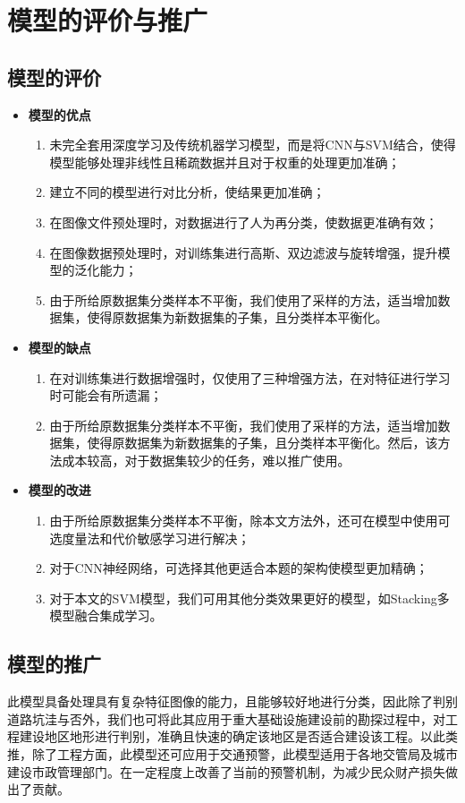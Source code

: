 \documentclass{MathorCupmodeling}
\begin{document}
	\section{模型的评价与推广}
	\subsection{模型的评价}
	\begin{itemize}
		\item \textbf{模型的优点}
		\begin{enumerate}
			\item 未完全套用深度学习及传统机器学习模型，而是将CNN与SVM结合，使得模型能够处理非线性且稀疏数据并且对于权重的处理更加准确；
			\item 建立不同的模型进行对比分析，使结果更加准确；
			\item 在图像文件预处理时，对数据进行了人为再分类，使数据更准确有效；
			\item 在图像数据预处理时，对训练集进行高斯、双边滤波与旋转增强，提升模型的泛化能力；
			\item 由于所给原数据集分类样本不平衡，我们使用了采样的方法，适当增加数据集，使得原数据集为新数据集的子集，且分类样本平衡化。
		\end{enumerate}
		\item \textbf{模型的缺点}
		\begin{enumerate}
			\item 在对训练集进行数据增强时，仅使用了三种增强方法，在对特征进行学习时可能会有所遗漏；
			\item 由于所给原数据集分类样本不平衡，我们使用了采样的方法，适当增加数据集，使得原数据集为新数据集的子集，且分类样本平衡化。然后，该方法成本较高，对于数据集较少的任务，难以推广使用。
		\end{enumerate}
		\item \textbf{模型的改进}
		\begin{enumerate}
			\item 由于所给原数据集分类样本不平衡，除本文方法外，还可在模型中使用可选度量法和代价敏感学习进行解决\textcolor{blue}{\cite{数据挖掘导论}}；
			\item 对于CNN神经网络，可选择其他更适合本题的架构使模型更加精确；
			\item 对于本文的SVM模型，我们可用其他分类效果更好的模型，如Stacking多模型融合集成学习。
		\end{enumerate}
	\end{itemize}
	\subsection{模型的推广}
	此模型具备处理具有复杂特征图像的能力，且能够较好地进行分类，因此除了判别道路坑洼与否外，我们也可将此其应用于重大基础设施建设前的勘探过程中，对工程建设地区地形进行判别，准确且快速的确定该地区是否适合建设该工程。以此类推，除了工程方面，此模型还可应用于交通预警，此模型适用于各地交管局及城市建设市政管理部门。在一定程度上改善了当前的预警机制，为减少民众财产损失做出了贡献。
	\newpage
	
\end{document}
